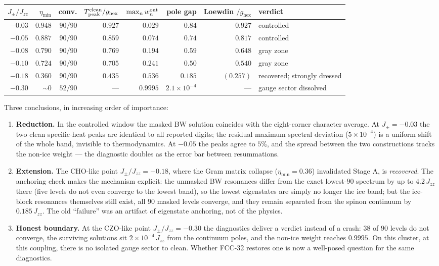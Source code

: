 \documentclass[11pt,letterpaper]{article}
\newcommand{\Jzz}{J_{zz}}
\newcommand{\Jpm}{J_{\pm}}
\newcommand{\ghex}{g_{\mathrm{hex}}}
\theoremstyle{plain}
\theoremstyle{definition}
\begin{document}
\begin{center}
\footnotesize
\begin{tabular}{@{}rrrrrrrl@{}}
\toprule
$\Jpm/\Jzz$ & $\eta_{\min}$ & conv. & $T^{\rm clean}_{\rm peak}/\ghex$ &
$\max_n w_n^{\rm out}$ & pole gap & Loewdin $/\ghex$ & verdict\\
\midrule
$-0.03$ & $0.948$ & $90/90$ & $0.927$ & $0.029$ & $0.84$ & $0.927$ &
controlled\\
$-0.05$ & $0.887$ & $90/90$ & $0.859$ & $0.074$ & $0.74$ & $0.817$ &
controlled\\
$-0.08$ & $0.790$ & $90/90$ & $0.769$ & $0.194$ & $0.59$ & $0.648$ &
gray zone\\
$-0.10$ & $0.724$ & $90/90$ & $0.705$ & $0.241$ & $0.50$ & $0.540$ &
gray zone\\
$-0.18$ & $0.360$ & $90/90$ & $0.435$ & $0.536$ & $0.185$ & $(0.257)$ &
recovered; strongly dressed\\
$-0.30$ & $\sim0$ & $52/90$ & --- & $0.9995$ & $2.1\times10^{-4}$ & --- &
gauge sector dissolved\\
\bottomrule
\end{tabular}
\end{center}

Three conclusions, in increasing order of importance:

\begin{enumerate}
\item \textbf{Reduction.}  In the controlled window the masked BW solution
coincides with the eight-corner character average.  At $\Jpm=-0.03$ the two
clean specific-heat peaks are identical to all reported digits; the residual
maximum spectral deviation ($5\times10^{-4}$) is a uniform shift of the whole
band, invisible to thermodynamics.  At $-0.05$ the peaks agree to $5\%$, and
the spread between the two constructions tracks the non-ice weight --- the
diagnostic doubles as the error bar between resummations.
\item \textbf{Extension.}  The CHO-like point $\Jpm/\Jzz=-0.18$, where the
Gram matrix collapse ($\eta_{\min}=0.36$) invalidated Stage A, is
\emph{recovered}.  The anchoring check makes the mechanism explicit: the
unmasked BW resonances differ from the exact lowest-$90$ spectrum by up to
$4.2\,\Jzz$ there (five levels do not even converge to the lowest band), so
the lowest eigenstates are simply no longer the ice band; but the ice-block
resonances themselves still exist, all $90$ masked levels converge, and they
remain separated from the spinon continuum by $0.185\,\Jzz$.  The old
``failure'' was an artifact of eigenstate anchoring, not of the physics.
\item \textbf{Honest boundary.}  At the CZO-like point $\Jpm/\Jzz=-0.30$ the
diagnostics deliver a verdict instead of a crash: $38$ of $90$ levels do not
converge, the surviving solutions sit $2\times10^{-4}\,\Jzz$ from the
continuum poles, and the non-ice weight reaches $0.9995$.  On this cluster,
at this coupling, there is no isolated gauge sector to clean.  Whether
FCC-32 restores one is now a well-posed question for the same diagnostics.
\end{enumerate}
\end{document}
